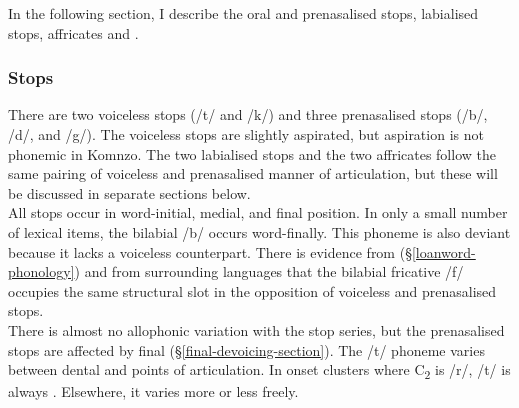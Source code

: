 In the following section, I describe the oral and prenasalised stops, labialised  stops, affricates and .

\subsubsection{Stops} \label{stopss}

There are two voiceless stops (/t/ and /k/) and three prenasalised stops (/b/, /d/, and /g/). The voiceless stops are slightly aspirated, but aspiration is not phonemic in Komnzo. The two labialised  stops and the two affricates follow the same pairing of voiceless and prenasalised manner of articulation, but these will be discussed in separate sections below.\\

All stops occur in word-initial, medial, and final position. In only a small number of lexical items, the bilabial /b/ occurs word-finally. This phoneme is also deviant because it lacks a voiceless counterpart. There is evidence from   (\S{}\ref{loanword-phonology}) and from surrounding  languages that the bilabial fricative /f/ occupies the same structural slot in the opposition of voiceless and prenasalised stops.\\

There is almost no allophonic variation with the stop series, but the prenasalised stops are affected by final  (\S{}\ref{final-devoicing-section}). The /t/ phoneme varies between dental and  points of articulation. In onset clusters where C\textsubscript{2} is /r/, /t/ is always . Elsewhere, it varies more or less freely.

